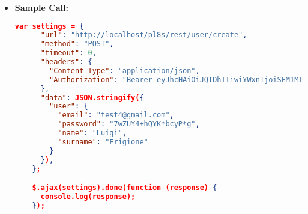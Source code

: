 \begin{itemize}
\begin{itemize}
\begin{lstlisting}[language=json]
    {
        "message": {
            "message": "Cannot authenticate the user.",
            "error-code": "EF00",
            "error-details": "Invalid JWT."
        }
    }
			\end{lstlisting}
		\end{itemize}	
    	\begin{itemize}
			\item[$\circ$] \textbf{Code:} 401 Unauthorized
			\item[] \textbf{Content:}
			\begin{lstlisting}[language=json]
    {
        "message": {
            "message": "Unauthorized user for the requested resource.",
            "error-code": "EF01",
            "error-details": "EF01"
        }
    }
			\end{lstlisting}
				\end{itemize}
    
    	\begin{itemize}
			\item[$\circ$] \textbf{Code:} 500 Internal Server Error
			\item[] \textbf{Content:}
			\begin{lstlisting}[language=json]
    {
        "message": {
            "message": "Cannot create the user.",
            "error-code": "ED00",
            "error-details": "User already registered."
        }
    }
			\end{lstlisting}

			\item[$\circ$] \textbf{Code:} 400 Bad Request
			\item[] \textbf{Content:}
			\begin{lstlisting}[language=json]
    {
        "message": {
            "message": "Cannot create the user: Invalid input parameters.",
            "error-code": "EP00",
            "error-details": "Invalid password."
        }
    }
			\end{lstlisting}
		\end{itemize}
    \item \textbf{Sample Call:}
		\begin{lstlisting}[language=json]		
    var settings = {
      "url": "http://localhost/pl8s/rest/user/create",
      "method": "POST",
      "timeout": 0,
      "headers": {
        "Content-Type": "application/json",
        "Authorization": "Bearer eyJhcHAiOiJQTDhTIiwiYWxnIjoiSFM1MTIifQ.eyJ1aWQiOjEsInJvbCI6ImFkbWluIiwic3Ry IjoiY3VzX1B3OHAyQlk2YkZYMm1iIiwiZGF0IjoxNzE0Mjc0MDk2MTkyfQ.2JrMhzazmE7qBH6A ASdIJj8C4pK0kjXcT9ZbGDRI5xfo6A_4IUA2oRzZwSzyrGXVEXB_ACCVV3GxONpDySlfvg"     
      },
      "data": JSON.stringify({
        "user": {
          "email": "test4@gmail.com",
          "password": "7wZUY4+hQYK*bcyP*g",
          "name": "Luigi",
          "surname": "Frigione"
        }
      }),
    };

    $.ajax(settings).done(function (response) {
      console.log(response);
    });	
	\end{lstlisting}
  \end{itemize}		

